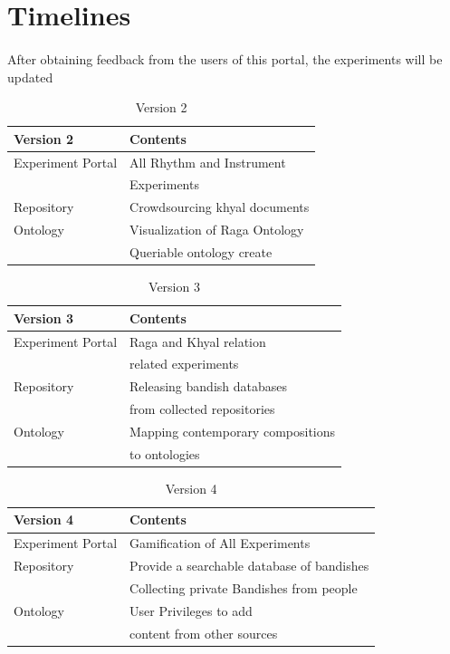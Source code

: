 \documentclass{tufte-handout}
\begin{document}
\section{Timelines}


\paragraph*{}
After obtaining feedback from the users of this portal, the experiments will be updated

\begin{table}[h]
\begin{tabular}{ll}
\toprule
Version 2                    & Contents      \\
\midrule
Experiment Portal & All Rhythm and Instrument\\ & Experiments\\
Repository & Crowdsourcing khyal documents\\
Ontology & Visualization of Raga Ontology\\
& Queriable ontology create\\
\bottomrule    
\end{tabular}
\caption{Version 2}
\end{table}


\begin{table}[h]
\begin{tabular}{ll}
\toprule
Version 3                    & Contents      \\
\midrule
Experiment Portal              & Raga and Khyal relation\\
& related experiments\\
Repository                     & Releasing bandish databases\\
& from collected repositories\\
Ontology & Mapping contemporary compositions\\
 & to ontologies\\
\bottomrule    
\end{tabular}
\caption{Version 3}
\end{table}


\begin{table}[h]
\begin{tabular}{ll}
\toprule
Version 4                    & Contents      \\
\midrule
Experiment Portal              & Gamification of All Experiments\\
Repository                     & Provide a searchable database of bandishes\\
 & Collecting private Bandishes from people\\
Ontology & User Privileges to add \\ 
& content from other sources\\
\bottomrule    
\end{tabular}
\caption{Version 4}
\end{table}
\end{document}
